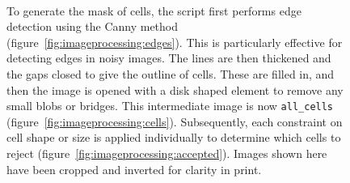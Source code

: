 \documentclass[../main.tex]{subfiles}
\begin{document}
\begin{figure}[p]
\begin{center}
\\
\caption[Depiction of cell detection]{To generate the mask of cells, the script first performs edge detection using the Canny method\cite{canny} (figure~\ref{fig:imageprocessing:edges}). This is particularly effective for detecting edges in noisy images. The lines are then thickened and the gaps closed to give the outline of cells. These are filled in, and then the image is opened with a disk shaped element to remove any small blobs or bridges. This intermediate image is now \texttt{all\_cells} (figure~\ref{fig:imageprocessing:cells}). Subsequently, each constraint on cell shape or size is applied individually to determine which cells to reject (figure~\ref{fig:imageprocessing:accepted}). Images shown here have been cropped and inverted for clarity in print.}
\label{fig:imageprocessing:celldetection}
\end{center}
\end{figure}
\end{document}
